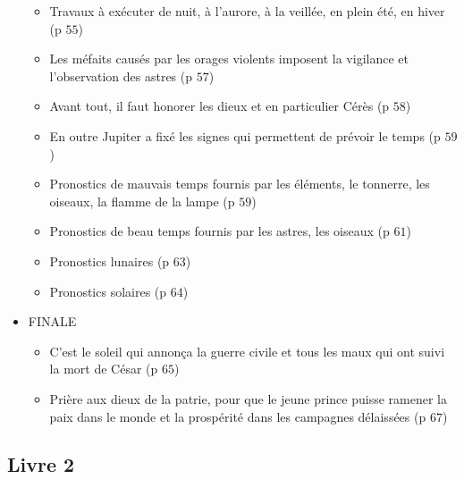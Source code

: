 \documentclass[a4paper, 11pt, hidelinks]{article}
\begin{document}
\begin{itemize}
\begin{itemize}
        \item Travaux à exécuter de nuit, à l'aurore, à la veillée, en plein été, en hiver (p $55$)
        \item Les méfaits causés par les orages violents imposent la vigilance et l'observation des astres (p $57$)
        \item Avant tout, il faut honorer les dieux et en particulier Cérès  (p $58$)
        \item En outre Jupiter a fixé les signes qui permettent de prévoir le temps (p $59$)
        \item Pronostics de mauvais temps fournis par les éléments, le tonnerre, les oiseaux, la flamme de la lampe (p $59$)
        \item Pronostics de beau temps fournis par les astres, les oiseaux (p $61$)
        \item Pronostics lunaires (p $63$)
        \item Pronostics solaires (p $64$)
    \end{itemize}
    \item FINALE \begin{itemize}
        \item C'est le soleil qui annonça la guerre civile et tous les maux qui ont suivi la mort de César (p $65$)
        \item Prière aux dieux de la patrie, pour que le jeune prince puisse ramener la paix dans le monde et la prospérité dans les campagnes délaissées (p $67$)
    \end{itemize}
\end{itemize}



\subsection{Livre 2}
\end{document}
